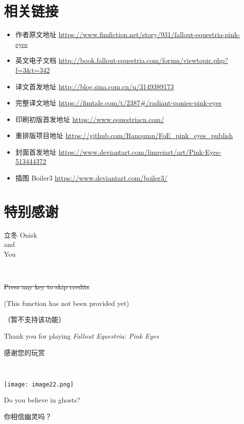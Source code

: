 \section*{相关链接}

\begin{itemize}
    \item 作者原文地址 \url{https://www.fimfiction.net/story/931/fallout-equestria-pink-eyes}
    \item 英文电子文档 \url{http://book.fallout-equestria.com/forum/viewtopic.php?f=3\&t=342}
    \item 译文首发地址 \url{http://blog.sina.com.cn/u/3149389173}
    \item 完整译文地址 \url{https://fimtale.com/t/2387\#/radiant-ponies-pink-eyes}
    \item 印刷初版首发地址 \url{https://www.equestriacn.com/}
    \item 重排版项目地址 \url{https://github.com/Ranqumn/FoE_pink_eyes_publish}
    \item 封面首发地址 \url{https://www.deviantart.com/limreiart/art/Pink-Eyes-513444372}
    \item 插图 Boiler3 \url{https://www.deviantart.com/boiler3/}
\end{itemize}


\section*{特别感谢}

\begin{center}
    立冬 \quad Onisk \bigskip \\
    and \bigskip \\
    You
\end{center}

\clearpage

~\vfill

\begin{center}
\sout{Press any key to skip credits}

(This function has not been provided yet)

\smallskip


（暂不支持该功能）

\medskip

Thank you for playing \emph{Fallout Equestria: Pink Eyes}

\smallskip

感谢您的玩赏
\end{center}

~\vfill

\texttt{[image: image22.png]}

\begin{motto}
    Do you believe in ghosts?

    你相信幽灵吗？
\end{motto}

